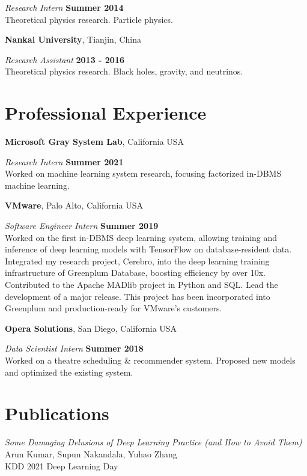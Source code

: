 \documentclass[margin,line]{res}
\begin{document}
\begin{resume}
\vspace{-.3cm}
{\em Research Intern} \hfill {\bf Summer 2014}\\
Theoretical physics research. Particle physics.

{\bf Nankai University}, Tianjin, China

\vspace{-.3cm}
{\em Research Assistant} \hfill {\bf 2013 - 2016}\\
Theoretical physics research. Black holes, gravity, and neutrinos. 

\section{\sc Professional Experience}
{\bf Microsoft Gray System Lab}, California USA

\vspace{-.3cm}
{\em Research Intern} \hfill {\bf Summer 2021}\\
Worked on machine learning system research, focusing factorized in-DBMS machine learning.


{\bf VMware}, Palo Alto, California USA

\vspace{-.3cm}
{\em Software Engineer Intern} \hfill {\bf Summer 2019}\\
Worked on the first in-DBMS deep learning system, allowing training and inference of deep learning models with TensorFlow on database-resident data. Integrated my research project, Cerebro, into the deep learning training infrastructure of Greenplum Database, boosting efficiency by over 10x. Contributed to the Apache MADlib project in Python and SQL. Lead the development of a major release. This project has been incorporated into Greenplum and production-ready for VMware's customers.

{\bf Opera Solutions}, San Diego, California USA

\vspace{-.3cm}
{\em Data Scientist Intern} \hfill {\bf Summer 2018}\\
Worked on a theatre scheduling \& recommender system. Proposed new models and optimized the existing system.

\section{\sc Publications}
\textit{Some Damaging Delusions of Deep Learning Practice (and How to Avoid Them)}\\
Arun Kumar, Supun Nakandala, Yuhao Zhang\\
KDD 2021 Deep Learning Day


\end{resume}
\end{document}
